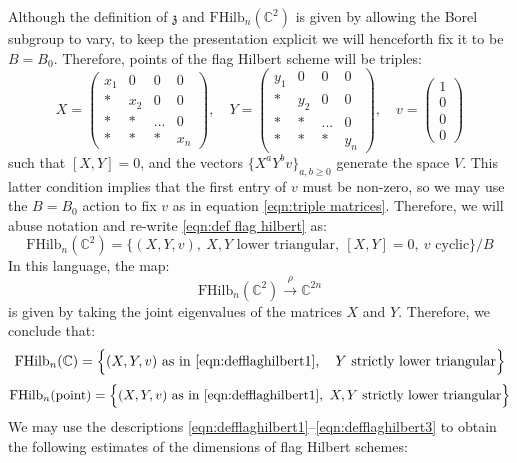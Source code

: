 \documentclass[12pt]{amsart}
\numberwithin{equation}{section}
\theoremstyle{definition}
\theoremstyle{remark}
\newcommand{\CC}{\mathbb{C}}
\renewcommand{\1}{\mathbf{1}}
\newcommand{\FH}{\mathrm{FHilb}}
\newcommand{\point}{\mathrm{point}}
\newcommand{\fz}{\mathfrak{z}}
\begin{document}
Although the definition of $\fz$ and $\FH_n(\CC^2)$ is given by allowing the Borel subgroup to vary, to keep the presentation explicit we will henceforth fix it to be $B=B_0$. Therefore, points of the flag Hilbert scheme will be triples:
\begin{equation}
\label{eqn:triple matrices}
X = \left( \begin{array}{cccc}
x_1 & 0 & 0 & 0 \\
* & x_2 & 0 & 0 \\
* & * & ... & 0 \\
* & * & * & x_{n} \end{array} \right), \quad Y = \left( \begin{array}{cccc}
y_1 & 0 & 0 & 0 \\
* & y_2 & 0 & 0 \\
* & * & ... & 0 \\
* & * & * & y_{n} \end{array} \right), \quad v = \left( \begin{array}{cccc}
1 \\
0 \\
0 \\
0 \end{array} \right)  
\end{equation}
such that $[X,Y]=0$, and the vectors $\{X^aY^bv\}_{a,b\geq 0}$ generate the space $V$. This latter condition implies that the first entry of $v$ must be non-zero, so we may use the $B=B_0$ action to fix $v$ as in equation \eqref{eqn:triple matrices}. Therefore, we will abuse notation and re-write \eqref{eqn:def flag hilbert} as:
\begin{equation}
\label{eqn:defflaghilbert1}
\FH_n(\CC^2) = \Big\{(X,Y,v), \ X,Y \text{ lower triangular}, \ [X,Y]=0, \ v \text{ cyclic} \Big\}/B 
\end{equation}
In this language, the map:
$$
\FH_n(\CC^2) \stackrel{\rho}\longrightarrow \CC^{2n}
$$
is given by taking the joint eigenvalues of the matrices $X$ and $Y$. Therefore, we conclude that:
\begin{equation}
\label{eqn:defflaghilbert2}
\FH_n(\CC) = \Big\{(X,Y,v) \text{ as in \eqref{eqn:defflaghilbert1}}, \ \ \ Y \text{ strictly lower triangular} \Big\}
\end{equation}
\begin{equation}
\label{eqn:defflaghilbert3}
\FH_n(\point) = \Big\{(X,Y,v) \text{ as in \eqref{eqn:defflaghilbert1}}, \ X , Y \text{ strictly lower triangular} \Big\}
\end{equation}
We may use the descriptions \eqref{eqn:defflaghilbert1}--\eqref{eqn:defflaghilbert3} to obtain the following estimates of the dimensions of flag Hilbert schemes:
\end{document}
